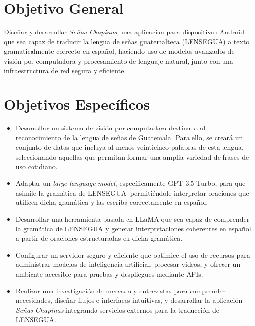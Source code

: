 \section{Objetivo General}

Diseñar y desarrollar \textit{Señas Chapinas}, una aplicación para dispositivos Android que sea capaz de traducir la lengua de señas guatemalteca (LENSEGUA) a texto gramaticalmente correcto en español, haciendo uso de modelos avanzados de visión por computadora y procesamiento de lenguaje natural, junto con una infraestructura de red segura y eficiente.


\section{Objetivos Específicos}
\begin{itemize}

\item Desarrollar un sistema de visión por computadora destinado al reconocimiento de la lengua de señas de Guatemala. Para ello, se creará un conjunto de datos que incluya al menos veinticinco palabras de esta lengua, seleccionando aquellas que permitan formar una amplia variedad de frases de uso cotidiano.

\item Adaptar un \textit{large language model}, específicamente GPT-3.5-Turbo, para que asimile la gramática de LENSEGUA, permitiéndole interpretar oraciones que utilicen dicha gramática y las escriba correctamente en español.

\item Desarrollar una herramienta basada en LLaMA que sea capaz de comprender la gramática de LENSEGUA y generar interpretaciones coherentes en español a partir de oraciones estructuradas en dicha gramática. 

\item Configurar un servidor seguro y eficiente que optimice el uso de recursos para administrar modelos de inteligencia artificial, procesar videos, y ofrecer un ambiente accesible para pruebas y despliegues mediante APIs.

\item Realizar una investigación de mercado y entrevistas para comprender necesidades, diseñar flujos e interfaces intuitivas, y desarrollar la aplicación \textit{Señas Chapinas} integrando servicios externos para la traducción de LENSEGUA.

\end{itemize}